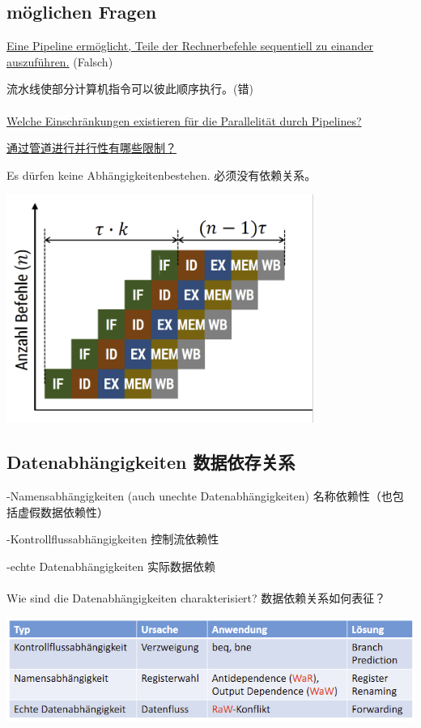 \documentclass[fleqn]{article}
\begin{document}
\subsection{möglichen Fragen}

\noindent\underline{Eine Pipeline ermöglicht, Teile der Rechnerbefehle sequentiell zu einander auszuführen.} (Falsch)

流水线使部分计算机指令可以彼此顺序执行。(错)
\\
\\
\noindent\underline{Welche Einschränkungen existieren für die Parallelität durch Pipelines?}

\underline{通过管道进行并行性有哪些限制？}

Es dürfen keine Abhängigkeitenbestehen. 必须没有依赖关系。

\begin{center}
    \includegraphics[scale=0.5]{30.png}
\end{center}

\subsection{Datenabhängigkeiten 数据依存关系}

-Namensabhängigkeiten (auch unechte Datenabhängigkeiten) 名称依赖性（也包括虚假数据依赖性）

-Kontrollflussabhängigkeiten 控制流依赖性

-echte Datenabhängigkeiten 实际数据依赖
\\
\\
Wie sind die Datenabhängigkeiten charakterisiert? 数据依赖关系如何表征？

\begin{center}
    \includegraphics[scale=0.5]{31.png}
\end{center}
\end{document}
